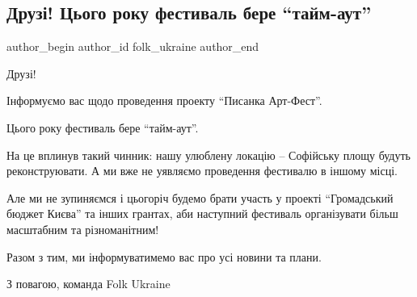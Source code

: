  
 
 
 
 

\subsection{Друзі! Цього року фестиваль бере \enquote{тайм-аут}}
\label{sec:28_02_2019.fb.folk_ukraine.1.festival_taking_timeout_this_year}

\ifcmt
 author_begin
   author_id folk_ukraine
 author_end
\fi

Друзі! 

Інформуємо вас щодо проведення проекту \enquote{Писанка Арт-Фест}. 

Цього року фестиваль бере \enquote{тайм-аут}. 

На це вплинув такий чинник: нашу улюблену локацію – Софійську площу будуть
реконструювати. А ми вже не уявляємо проведення фестивалю в іншому місці. 

Але ми не зупиняємся і цьогоріч будемо брати участь у проекті \enquote{Громадський
бюджет Києва} та інших грантах, аби наступний фестиваль організувати більш
масштабним та різноманітним!

Разом з тим, ми інформуватимемо вас про усі новини та плани. 

З повагою, команда Folk Ukraine

